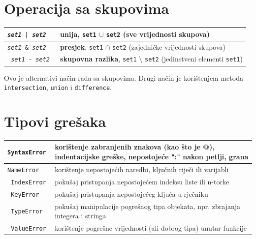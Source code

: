 \documentclass[10pt]{article}
\begin{document}
    \section*{\color{NavyBlue} Operacija sa skupovima}
    \begin{tabular}{|>{\tt}p{9.00cm}|>{}p{15.50cm}|}
        \hline
        \textit{set1} | \textit{set2} & \textbf{unija}, \texttt{set1} $\cup$ \texttt{set2} (sve vrijednosti skupova)
        \\ \hline
        \textit{set1} \& \textit{set2} & \textbf{presjek}, \texttt{set1} $\cap$ \texttt{set2} (zajedničke vrijednosti skupova)
        \\ \hline    
        \textit{set1} - \textit{set2} & \textbf{skupovna razlika}, \texttt{set1} $\setminus$ \texttt{set2} (jedinstveni elementi \texttt{set1})
        \\ \hline
    \end{tabular}
    \begin{center}
        Ovo je alternativi način rada sa skupovima. Drugi način je korištenjem metoda \texttt{intersection}, \texttt{union} i \texttt{difference}.
    \end{center}

    \section*{\color{NavyBlue} Tipovi grešaka}
    \begin{tabular}{|>{\tt}p{9.00cm}|>{}p{15.50cm}|}
        \hline
        SyntaxError & korištenje zabranjenih znakova (kao što je @), indentacijske greške, nepostojeće ":" nakon petlji, grana
        \\ \hline
        NameError & korištenje nepostojećih naredbi, ključnih riječi ili varijabli
        \\ \hline
        IndexError & pokušaj pristupanja nepostojećem indeksu liste ili n-torke
        \\ \hline
        KeyError & pokušaj pristupanja nepostojećeg ključa u rječniku
        \\ \hline
        TypeError & pokušaj manipulacije pogrešnog tipa objekata, npr. zbrajanja integera i stringa
        \\ \hline
        ValueError & korištenje pogrešne vrijednosti (ali dobrog tipa) unutar funkcije
        \\ \hline
    \end{tabular}
\end{document}
